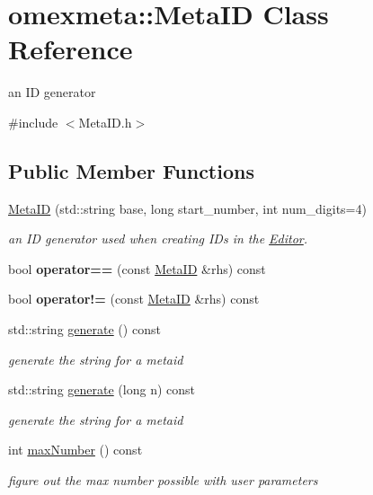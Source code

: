 \hypertarget{classomexmeta_1_1MetaID}{}\section{omexmeta\+:\+:Meta\+ID Class Reference}
\label{classomexmeta_1_1MetaID}


an ID generator  




{\ttfamily \#include $<$Meta\+I\+D.\+h$>$}

\subsection*{Public Member Functions}
\begin{DoxyCompactItemize}
\item 
\hyperlink{classomexmeta_1_1MetaID_af5cc076ccd6db8c411de98902d2a1218}{Meta\+ID} (std\+::string base, long start\+\_\+number, int num\+\_\+digits=4)
\begin{DoxyCompactList}\small\item\em an ID generator used when creating I\+Ds in the \hyperlink{classomexmeta_1_1Editor}{Editor}. \end{DoxyCompactList}\item 
\mbox{\label{classomexmeta_1_1MetaID_a3d6466efca8d9e931ca8c440c0809584}} 
bool {\bfseries operator==} (const \hyperlink{classomexmeta_1_1MetaID}{Meta\+ID} \&rhs) const
\item 
\mbox{\label{classomexmeta_1_1MetaID_a25af693b284b0110914c537b48b20937}} 
bool {\bfseries operator!=} (const \hyperlink{classomexmeta_1_1MetaID}{Meta\+ID} \&rhs) const
\item 
std\+::string \hyperlink{classomexmeta_1_1MetaID_a95e709df9b0ee47473bc40012738cdc8}{generate} () const
\begin{DoxyCompactList}\small\item\em generate the string for a metaid \end{DoxyCompactList}\item 
std\+::string \hyperlink{classomexmeta_1_1MetaID_a9a3c9b479d522e7630275d85582edd26}{generate} (long n) const
\begin{DoxyCompactList}\small\item\em generate the string for a metaid \end{DoxyCompactList}\item 
int \hyperlink{classomexmeta_1_1MetaID_a343f4b48c9673f8943e03057370f01e4}{max\+Number} () const
\begin{DoxyCompactList}\small\item\em figure out the max number possible with user parameters \end{DoxyCompactList}\end{DoxyCompactItemize}
